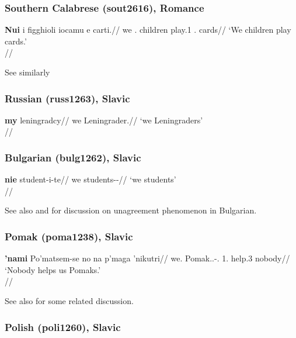 \documentclass[A4paper]{article}
\begin{document}
\subsubsection{Southern Calabrese (sout2616), Romance}

\ex \begingl
\gla \textbf{Nui} i figghioli iocamu e carti.//
\glb we \Det.\Pl{} children play.1\Pl{} \Det.\Pl{} cards//
\glft `We children play cards.'\\\citep[276, (23c)]{hoehnetalICGLcalabria}//
\endgl
\xe

See similarly \citet[142]{hoehnetal2016CalabrUnagr}

\subsubsection{Russian (russ1263), Slavic}

\ex \begingl
\gla \textbf{my} leningradcy//
\glb we Leningrader.\Pl//
\glft `we Leningraders'\\\citep[352, (4c)]{pesetsky1978}//
\endgl
\xe

\newpage

\subsubsection{Bulgarian (bulg1262), Slavic}

\ex \begingl
\gla \textbf{nie} student-i-te//
\glb we students-\Pl-\Def//
\glft `we students'\\\citep[560]{hoehn2015unagr}//
\endgl
\xe

See also \citet{osenova2003} and \citet{norman2001} for discussion on unagreement phenomenon in Bulgarian.


\subsubsection{Pomak (poma1238), Slavic}

\ex
\begingl
\gla \textbf{'nami} Po'matsem-se no na p\textturnv{}'maga 'nikutri//
\glb we.\Dat{} Pomak.\Dat.\Pl{}-\Det.\Prox{} 1\Pl.\Acc{} \Neg{} help.3\Sg{} nobody//
\glft `Nobody helps us Pomaks.'\\ \citep[582]{papadimitriou2008}//
\endgl
\xe 

See also \citet[269--272]{hoehnPhD} for some related discussion.

\subsubsection{Polish (poli1260), Slavic}
\end{document}
